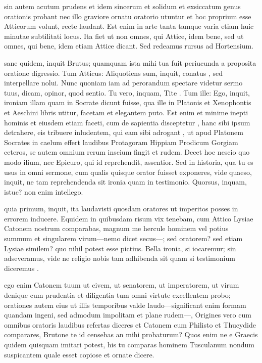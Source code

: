  sin autem acutum prudens et idem sincerum et solidum et exsiccatum genus orationis probant nec illo graviore ornatu oratorio utuntur et hoc proprium esse Atticorum volunt, recte laudant. Est enim in arte tanta tamque varia etiam huic minutae subtilitati locus. Ita fiet ut non omnes, qui Attice, idem bene, sed ut omnes, qui bene, idem etiam Attice dicant. Sed redeamus rursus ad Hortensium.

 sane quidem, inquit Brutus; quamquam ista mihi tua fuit periucunda a proposita oratione digressio. Tum Atticus: Aliquotiens sum, inquit, conatus , sed interpellare nolui. Nunc quoniam iam ad perorandum spectare videtur sermo tuus, dicam, opinor, quod sentio. Tu vero, inquam, Tite . Tum ille: Ego, inquit, ironiam illam quam in Socrate dicunt fuisse, qua ille in Platonis et Xenophontis et Aeschini libris utitur, facetam et elegantem puto. Est enim et minime inepti hominis et eiusdem etiam faceti, cum de sapientia disceptetur , hanc sibi ipsum detrahere, eis tribuere inludentem, qui eam sibi adrogant , ut apud Platonem Socrates in caelum effert laudibus Protagoram Hippiam Prodicum Gorgiam ceteros, se autem omnium rerum inscium fingit et rudem. Decet hoc nescio quo modo ilium, nec Epicuro, qui id reprehendit, assentior. Sed in historia, qua tu es usus in omni sermone, cum qualis quisque orator fuisset exponeres, vide quaeso, inquit, ne tam reprehendenda sit ironia quam in testimonio. Quorsus, inquam, istuc? non enim intellego.

 quia primum, inquit, ita laudavisti quosdam oratores ut imperitos posses in errorem inducere. Equidem in quibusdam risum vix tenebam, cum Attico Lysiae Catonem nostrum comparabas, magnum me hercule hominem vel potius summum et singularem virum—nemo dicet secus—; sed oratorem? sed etiam Lysiae similem? quo nihil potest esse pictius. Bella ironia, si iocaremur; sin adseveramus, vide ne religio nobis tam adhibenda sit quam si testimonium diceremus .

 ego enim Catonem tuum ut civem, ut senatorem, ut imperatorem, ut virum denique cum prudentia et diligentia tum omni virtute excellentem probo; orationes autem eius ut illis temporibus valde laudo—significant enim formam quandam ingeni, sed admodum impolitam et plane rudem—, Origines vero cum omnibus oratoris laudibus refertas diceres et Catonem cum Philisto et Thucydide comparares, Brutone te id censebas an mihi probaturum? Quos enim ne e Graecis quidem quisquam imitari potest, his tu comparas hominem Tusculanum nondum suspicantem quale esset copiose et ornate dicere.

